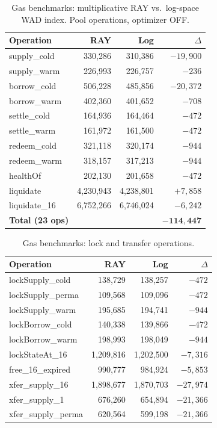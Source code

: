 \documentclass[10pt,a4paper,twocolumn]{article}
\theoremstyle{definition}
\theoremstyle{plain}
\theoremstyle{remark}
\begin{document}
\begin{table}[htbp]
\centering
\caption{Gas benchmarks: multiplicative RAY vs.\ log-space WAD index. Pool operations, optimizer OFF.}
\label{tab:gas-pool}
\small
\begin{tabular*}{0.95\columnwidth}{@{\extracolsep{\fill}}lrrr@{}}
\toprule
Operation & RAY & Log & $\Delta$ \\
\midrule
supply\_cold & 330,286 & 310,386 & $-19{,}900$ \\
supply\_warm & 226,993 & 226,757 & $-236$ \\
borrow\_cold & 506,228 & 485,856 & $-20{,}372$ \\
borrow\_warm & 402,360 & 401,652 & $-708$ \\
settle\_cold & 164,936 & 164,464 & $-472$ \\
settle\_warm & 161,972 & 161,500 & $-472$ \\
redeem\_cold & 321,118 & 320,174 & $-944$ \\
redeem\_warm & 318,157 & 317,213 & $-944$ \\
healthOf & 202,130 & 201,658 & $-472$ \\
liquidate & 4,230,943 & 4,238,801 & $+7{,}858$ \\
liquidate\_16 & 6,752,266 & 6,746,024 & $-6{,}242$ \\
\midrule
\textbf{Total (23 ops)} & & & $\mathbf{-114{,}447}$ \\
\bottomrule
\end{tabular*}
\end{table}

\begin{table}[htbp]
\centering
\caption{Gas benchmarks: lock and transfer operations.}
\label{tab:gas-lock}
\small
\begin{tabular*}{0.95\columnwidth}{@{\extracolsep{\fill}}lrrr@{}}
\toprule
Operation & RAY & Log & $\Delta$ \\
\midrule
lockSupply\_cold & 138,729 & 138,257 & $-472$ \\
lockSupply\_perma & 109,568 & 109,096 & $-472$ \\
lockSupply\_warm & 195,685 & 194,741 & $-944$ \\
lockBorrow\_cold & 140,338 & 139,866 & $-472$ \\
lockBorrow\_warm & 198,993 & 198,049 & $-944$ \\
lockStateAt\_16 & 1,209,816 & 1,202,500 & $-7{,}316$ \\
free\_16\_expired & 990,777 & 984,924 & $-5{,}853$ \\
xfer\_supply\_16 & 1,898,677 & 1,870,703 & $-27{,}974$ \\
xfer\_supply\_1 & 676,260 & 654,894 & $-21{,}366$ \\
xfer\_supply\_perma & 620,564 & 599,198 & $-21{,}366$ \\
\bottomrule
\end{tabular*}
\end{table}
\end{document}
